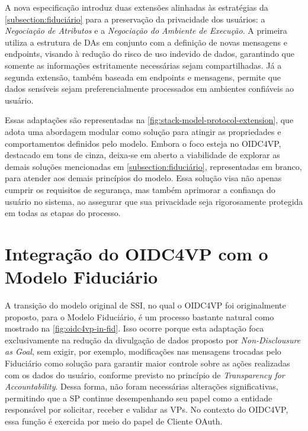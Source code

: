 
A nova especificação introduz duas extensões alinhadas às estratégias da \autoref{subsection:fiduciário} para a preservação da privacidade dos usuários: a \emph{Negociação de Atributos} e a \emph{Negociação do Ambiente de Execução}. A primeira utiliza a estrutura de \acs{DA}s em conjunto com a definição de novas mensagens e endpoints, visando à redução do risco de uso indevido de dados, garantindo que somente as informações estritamente necessárias sejam compartilhadas. Já a segunda extensão, também baseada em endpoints e mensagens, permite que dados sensíveis sejam preferencialmente processados em ambientes confiáveis ao usuário.

Essas adaptações são representadas na \autoref{fig:stack-model-protocol-extension}, que adota uma abordagem modular como solução para atingir as propriedades e comportamentos definidos pelo modelo. Embora o foco esteja no \acs{OIDC4VP}, destacado em tons de cinza, deixa-se em aberto a viabilidade de explorar as demais soluções mencionadas em \autoref{subsection:fiduciário}, representadas em branco, para atender aos demais princípios do modelo.
Essa solução visa não apenas cumprir os requisitos de segurança, mas também aprimorar a confiança do usuário no sistema, ao assegurar que sua privacidade seja rigorosamente protegida em todas as etapas do processo.



\section{Integração do OIDC4VP com o Modelo Fiduciário}

A transição do modelo original de \acs{SSI}, no qual o \acs{OIDC4VP} foi originalmente proposto, para o Modelo Fiduciário, é um processo bastante natural como mostrado na \autoref{fig:oidc4vp-in-fid}. 
Isso ocorre porque esta adaptação foca exclusivamente na redução da divulgação de dados proposto por \emph{Non-Disclousure as Goal}, sem exigir, por exemplo, modificações nas mensagens trocadas pelo Fiduciário como solução para garantir maior controle sobre as ações realizadas com os dados do usuário, conforme previsto no princípio de \emph{Transparency for Accountability}.
Dessa forma, não foram necessárias alterações significativas, permitindo que a \acs{SP} continue desempenhando seu papel como a entidade responsável por solicitar, receber e validar as \acs{VP}s. No contexto do \acs{OIDC4VP}, essa função é exercida por meio do papel de Cliente OAuth.

